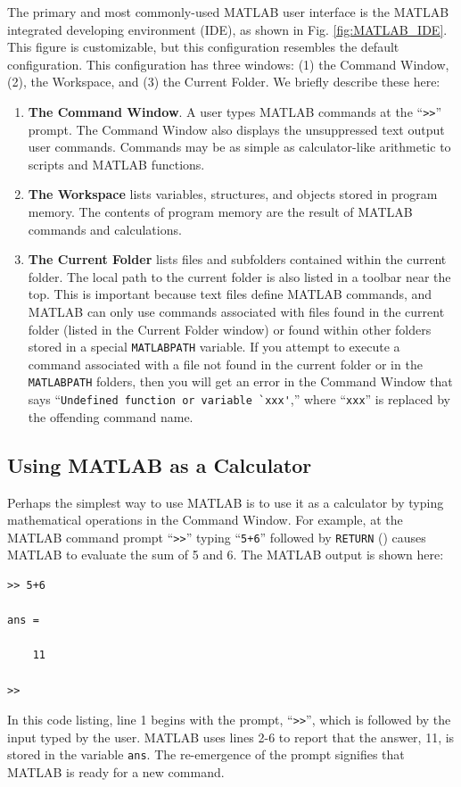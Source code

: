 The primary and most commonly-used MATLAB user interface is the MATLAB integrated developing environment (IDE), as shown in Fig. \ref{fig:MATLAB_IDE}. This figure is customizable, but this configuration resembles the default configuration. This configuration has three windows: (1) the Command Window, (2), the Workspace, and (3) the Current Folder. We briefly describe these here:
\begin{enumerate}
\item \textbf{The Command Window}. A user types MATLAB commands at the ``\verb!>>!'' prompt. The Command Window also displays the unsuppressed text output user commands. Commands may be as simple as calculator-like arithmetic to scripts and MATLAB functions.
\item \textbf{The Workspace} lists variables, structures, and objects stored in program memory. The contents of program memory are the result of MATLAB commands and calculations.
\item \textbf{The Current Folder} lists files and subfolders contained within the current folder. The local path to the current folder is also listed in a toolbar near the top. This is important because text files define MATLAB commands, and MATLAB can only use commands associated with files found in the current folder (listed in the Current Folder window) or found within other folders stored in a special \texttt{MATLABPATH} variable. If you attempt to execute a command associated with a file not found in the current folder or in the \texttt{MATLABPATH} folders, then you will get an error in the Command Window that says ``\verb!Undefined function or variable `xxx'!,'' where ``\verb!xxx!'' is replaced by the offending command name.
\end{enumerate}

\subsection{Using MATLAB as a Calculator}
\label{subsect:MATLAB_calculator}
Perhaps the simplest way to use MATLAB is to use it as a calculator by typing mathematical operations in the Command Window. For example, at the MATLAB command prompt ``\verb!>>!'' typing ``\verb!5+6!''  followed by \texttt{RETURN} (\keys{\return}) causes MATLAB to evaluate the sum of 5 and 6. The MATLAB output is shown here:
\begin{lstlisting}[style=Matlab-editor, label={MATLABCalculator01}, caption={A simple addition calculation in MATLAB returns its result.}]
>> 5+6

ans =

    11

>> 
\end{lstlisting}
In this code listing, line 1 begins with the prompt, ``\verb!>>!'', which is followed by the input typed by the user. MATLAB uses lines 2-6 to report that the answer, 11, is stored in the variable \verb!ans!. The re-emergence of the prompt signifies that MATLAB is ready for a new command.

